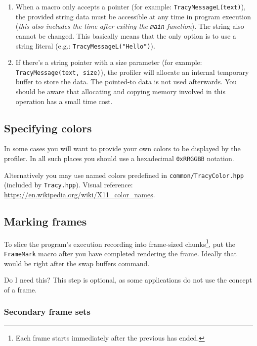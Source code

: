 \documentclass[hidelinks,titlepage,a4paper]{article}
\begin{document}
\begin{enumerate}
\item When a macro only accepts a pointer (for example: \texttt{TracyMessageL(text)}), the provided string data must be accessible at any time in program execution (\emph{this also includes the time after exiting the \texttt{main} function}). The string also cannot be changed. This basically means that the only option is to use a string literal (e.g.: \texttt{TracyMessageL("Hello")}).

\item If there's a string pointer with a size parameter (for example: \texttt{TracyMessage(text, size)}), the profiler will allocate an internal temporary buffer to store the data. The pointed-to data is not used afterwards. You should be aware that allocating and copying memory involved in this operation has a small time cost.
\end{enumerate}

\subsection{Specifying colors}

In some cases you will want to provide your own colors to be displayed by the profiler. In all such places you should use a hexadecimal \texttt{0xRRGGBB} notation.

Alternatively you may use named colors predefined in \texttt{common/TracyColor.hpp} (included by \texttt{Tracy.hpp}). Visual reference: \url{https://en.wikipedia.org/wiki/X11_color_names}.

\subsection{Marking frames}
\label{markingframes}

To slice the program's execution recording into frame-sized chunks\footnote{Each frame starts immediately after the previous has ended.}, put the \texttt{FrameMark} macro after you have completed rendering the frame. Ideally that would be right after the swap buffers command.

\begin{bclogo}[
noborder=true,
couleur=black!5,
logo=\bclampe
]{Do I need this?}
This step is optional, as some applications do not use the concept of a frame.
\end{bclogo}

\subsubsection{Secondary frame sets}
\label{secondaryframeset}
\end{document}
